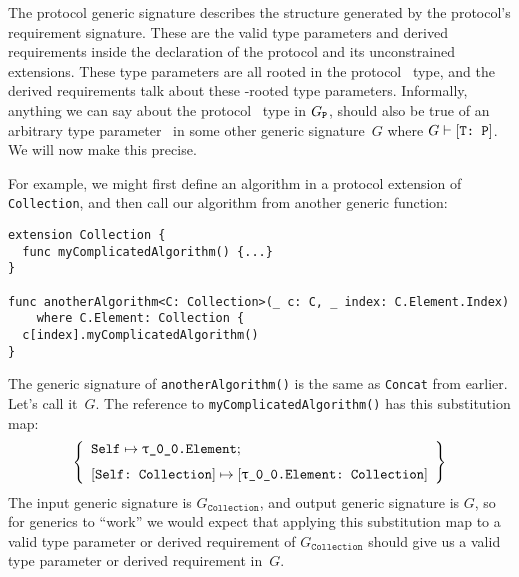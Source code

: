 \documentclass[../generics]{subfiles}
\begin{document}
The protocol generic signature describes the structure generated by the protocol's requirement signature. These are the valid type parameters and derived requirements inside the declaration of the protocol and its unconstrained extensions. These type parameters are all rooted in the protocol \tSelf\ type, and the derived requirements talk about these \tSelf-rooted type parameters. Informally, anything we can say about the protocol \tSelf\ type in $G_{\texttt{P}}$, should also be true of an arbitrary type parameter \tT\ in some other generic signature~$G$ where $G\vdash[\texttt{T:~P}]$. We will now make this precise.

For example, we might first define an algorithm in a protocol extension of \texttt{Collection}, and then call our algorithm from another generic function:
\begin{Verbatim}
extension Collection {
  func myComplicatedAlgorithm() {...}
}

func anotherAlgorithm<C: Collection>(_ c: C, _ index: C.Element.Index)
    where C.Element: Collection {
  c[index].myComplicatedAlgorithm()
}
\end{Verbatim}
The generic signature of \texttt{anotherAlgorithm()} is the same as \texttt{Concat} from earlier. Let's call it~$G$. The reference to \texttt{myComplicatedAlgorithm()} has this substitution map:
\[
\SubstMapLongC{\SubstType{Self}{\rT.Element}}{\SubstConf{Self}{\rT.Element}{Collection}}
\]
The input generic signature is $G_\texttt{Collection}$, and output generic signature is $G$, so for generics to ``work'' we would expect that applying this substitution map to a valid type parameter or derived requirement of $G_\texttt{Collection}$ should give us a valid type parameter or derived requirement in~$G$.
\end{document}

